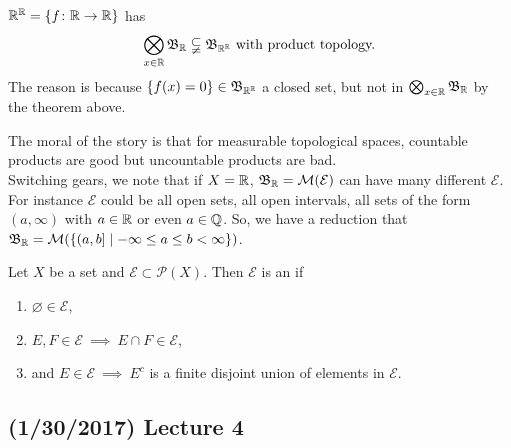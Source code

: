 \documentclass[11pt,leqno,oneside]{amsbook}
\numberwithin{thm}{section}
\renewcommand{\P}{\mathcal{P}} %
\newcommand{\M}{\mathcal{M}} %
\newcommand{\Ep}{\mathcal{E}} %
\begin{document}
\begin{example}
  ${\mathbb R}^{\mathbb R} = \{f\colon  {\mathbb R} \to {\mathbb R}\}$ has \[
    \bigotimes_{x \in {\mathbb R}} \mathfrak{B}_{\mathbb R} \subsetneqq \mathfrak{B}_{{\mathbb R}^{\mathbb R}} \text{ with
      product topology.}
  \]
  The reason is because $\{f(x) = 0\} \in \mathfrak{B}_{{\mathbb R}^{\mathbb R}}$ a closed set,
  but not in $\bigotimes_{x \in {\mathbb R}} \mathfrak{B}_{\mathbb R}$ by the theorem above.
\end{example}
The moral of the story is that for measurable topological spaces,
countable products are good but uncountable products are bad. \\

Switching gears, we note that if $X = {\mathbb R}$, $\B_\R = \M(\Ep)$ can have
many different $\Ep$. For instance $\Ep$ could be all open sets, all
open intervals, all sets of the form $(a, \infty)$ with $a \in {\mathbb R}$ or
even $a \in {\mathbb Q}$. So, we have a reduction that $\B_\R = \M(\{(a,b] \mid
-\infty \leq a \leq b < \infty\})$.
\begin{defn}
  Let $X$ be a set and $\Ep \subset \P(X)$. Then $\Ep$ is an
   if
  \begin{enumerate}
  \item $\varnothing \in \Ep$,
  \item $E,F \in \Ep \ \implies \ E \cap F \in \Ep$,
  \item and $E \in \Ep \ \implies \ E^c$ is a finite disjoint union of
    elements in $\Ep$.
  \end{enumerate}
\end{defn}
\subsection*{(1/30/2017) Lecture 4}
\end{document}
